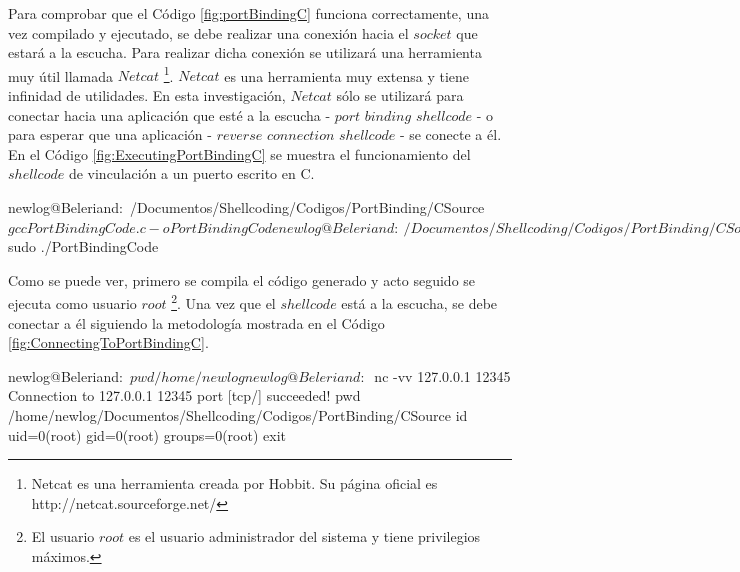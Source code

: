\documentclass [titlepage, 12pt]{article}
\newcommand{\topfigrule}{\hrule\vspace{4 pt}}
\newcommand{\botfigrule}{\hrule\vspace{4 pt}}
\begin{document}
Para comprobar que el C\'odigo \ref{fig:portBindingC} funciona correctamente, una vez compilado y ejecutado, se debe realizar una conexi\'on hacia el $socket$ que estar\'a a la escucha. Para realizar dicha conexi\'on se utilizar\'a una herramienta muy \'util llamada $Netcat$ \footnote{Netcat es una herramienta creada por Hobbit. Su p\'agina oficial es http://netcat.sourceforge.net/}. $Netcat$ es una herramienta muy extensa y tiene infinidad de utilidades. En esta investigaci\'on, $Netcat$ s\'olo se utilizar\'a para conectar hacia una aplicaci\'on que est\'e a la escucha - $port$ $binding$ $shellcode$ - o para esperar que una aplicaci\'on - $reverse$ $connection$ $shellcode$ - se conecte a \'el.\\
En el C\'odigo \ref{fig:ExecutingPortBindingC} se muestra el funcionamiento del $shellcode$ de vinculaci\'on a un puerto escrito en C.

\begin{listing}[style=consola, numbers=none, caption=Ejecuci\'on del $shellcode$ de vinculaci\'on a un puerto en C, label=fig:ExecutingPortBindingC]
		newlog@Beleriand:~/Documentos/Shellcoding/Codigos/PortBinding/CSource$ 
		gcc PortBindingCode.c -o PortBindingCode
		newlog@Beleriand:~/Documentos/Shellcoding/Codigos/PortBinding/CSource$ 
		sudo ./PortBindingCode 
\end{listing}

Como se puede ver, primero se compila el c\'odigo generado y acto seguido se ejecuta como usuario $root$ \footnote{El usuario $root$ es el usuario administrador del sistema y tiene privilegios m\'aximos.}. Una vez que el $shellcode$ est\'a a la escucha, se debe conectar a \'el siguiendo la metodolog\'ia mostrada en el C\'odigo \ref{fig:ConnectingToPortBindingC}.

\begin{listing}[style=consola, numbers=none, caption=Ejecuci\'on del $shellcode$ de vinculaci\'on a un puerto en C, label=fig:ConnectingToPortBindingC]	
		newlog@Beleriand:~$ pwd
		/home/newlog
		newlog@Beleriand:~$ nc -vv 127.0.0.1 12345
		Connection to 127.0.0.1 12345 port [tcp/] succeeded!
		pwd
		/home/newlog/Documentos/Shellcoding/Codigos/PortBinding/CSource
		id
		uid=0(root) gid=0(root) groups=0(root)
		exit
\end{listing}
\end{document}
